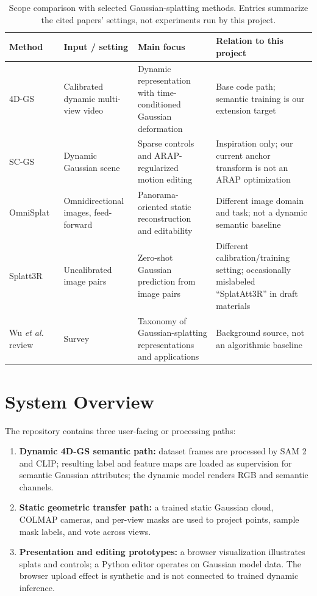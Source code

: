 \documentclass[conference]{IEEEtran}
\begin{document}
\begin{table}[t]
\caption{Scope comparison with selected Gaussian-splatting methods. Entries summarize the cited papers' settings, not experiments run by this project.}
\label{tab:related}
\centering
\footnotesize
\begin{tabularx}{\textwidth}{p{}p{}X X}
\toprule
Method & Input / setting & Main focus & Relation to this project \\
\midrule
4D-GS~\cite{wu20244dgs} & Calibrated dynamic multi-view video & Dynamic representation with time-conditioned Gaussian deformation & Base code path; semantic training is our extension target \\
SC-GS~\cite{huang2024scgs} & Dynamic Gaussian scene & Sparse controls and ARAP-regularized motion editing & Inspiration only; our current anchor transform is not an ARAP optimization \\
OmniSplat~\cite{leeOmniSplat2025} & Omnidirectional images, feed-forward & Panorama-oriented static reconstruction and editability & Different image domain and task; not a dynamic semantic baseline \\
Splatt3R~\cite{smartSplatt3R2024} & Uncalibrated image pairs & Zero-shot Gaussian prediction from image pairs & Different calibration/training setting; occasionally mislabeled ``SplatAtt3R'' in draft materials \\
Wu \emph{et al.} review~\cite{wuReview2024} & Survey & Taxonomy of Gaussian-splatting representations and applications & Background source, not an algorithmic baseline \\
\bottomrule
\end{tabularx}
\end{table}

\section{System Overview}
The repository contains three user-facing or processing paths:
\begin{enumerate}
    \item \textbf{Dynamic 4D-GS semantic path:} dataset frames are processed by SAM 2 and CLIP; resulting label and feature maps are loaded as supervision for semantic Gaussian attributes; the dynamic model renders RGB and semantic channels.
    \item \textbf{Static geometric transfer path:} a trained static Gaussian cloud, COLMAP cameras, and per-view masks are used to project points, sample mask labels, and vote across views.
    \item \textbf{Presentation and editing prototypes:} a browser visualization illustrates splats and controls; a Python editor operates on Gaussian model data. The browser upload effect is synthetic and is not connected to trained dynamic inference.
\end{enumerate}
\end{document}
